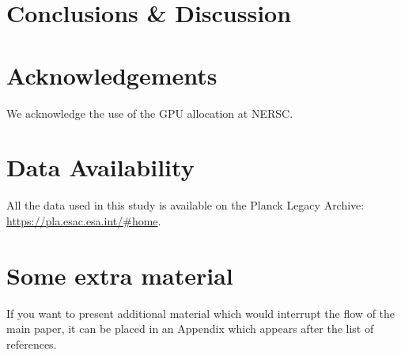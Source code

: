 \documentclass[fleqn,usenatbib]{mnras}
\begin{document}
\label{sec:results}


\section{Conclusions \& Discussion}
\label{sec:conclusions}


\section*{Acknowledgements}

We acknowledge the use of the GPU allocation at NERSC.

\section*{Data Availability}

 
All the data used in this study is available on the Planck Legacy Archive: \url{https://pla.esac.esa.int/#home}.












\appendix

\section{Some extra material}

If you want to present additional material which would interrupt the flow of the main paper,
it can be placed in an Appendix which appears after the list of references.



\bsp	%
\label{lastpage}
\end{document}

